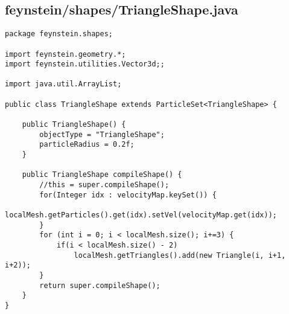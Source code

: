 \subsection*{feynstein/shapes/TriangleShape.java}
\begin{lstlisting}
package feynstein.shapes;

import feynstein.geometry.*;
import feynstein.utilities.Vector3d;;

import java.util.ArrayList;

public class TriangleShape extends ParticleSet<TriangleShape> {
	
	public TriangleShape() {
		objectType = "TriangleShape";
		particleRadius = 0.2f;
	}
    
    public TriangleShape compileShape() {
		//this = super.compileShape();
		for(Integer idx : velocityMap.keySet()) {
			localMesh.getParticles().get(idx).setVel(velocityMap.get(idx));
		}		
		for (int i = 0; i < localMesh.size(); i+=3) {
			if(i < localMesh.size() - 2)
				localMesh.getTriangles().add(new Triangle(i, i+1, i+2));
		}
		return super.compileShape();
    }
}\end{lstlisting}

